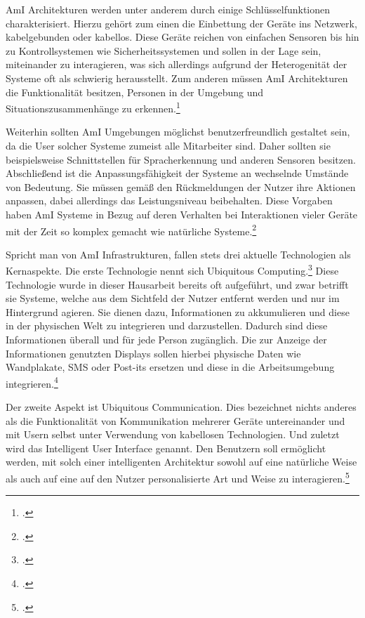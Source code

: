 AmI Architekturen werden unter anderem durch einige Schlüsselfunktionen charakterisiert. Hierzu gehört zum einen die Einbettung der Geräte ins Netzwerk, kabelgebunden oder kabellos. Diese Geräte reichen von einfachen Sensoren bis hin zu Kontrollsystemen wie Sicherheitssystemen und sollen in der Lage sein, miteinander zu interagieren, was sich allerdings aufgrund der Heterogenität der Systeme oft als schwierig herausstellt. Zum anderen müssen AmI Architekturen die Funktionalität besitzen, Personen in der Umgebung und Situationszusammenhänge zu erkennen.\footcite[Vgl.][Seite 585]{SpecialIssue}

Weiterhin sollten AmI Umgebungen möglichst benutzerfreundlich gestaltet sein, da die User solcher Systeme zumeist alle Mitarbeiter sind. Daher sollten sie beispielsweise Schnittstellen für Spracherkennung und anderen Sensoren besitzen. Abschließend ist die Anpassungsfähigkeit der Systeme an wechselnde Umstände von Bedeutung. Sie müssen gemäß den Rückmeldungen der Nutzer ihre Aktionen anpassen, dabei allerdings das Leistungsniveau beibehalten. Diese Vorgaben haben AmI Systeme in Bezug auf deren Verhalten bei Interaktionen vieler Geräte mit der Zeit so komplex gemacht wie natürliche Systeme.\footcite[Vgl.][Seite 586]{SpecialIssue}

Spricht man von AmI Infrastrukturen, fallen stets drei aktuelle Technologien als Kernaspekte. Die erste Technologie nennt sich Ubiquitous Computing.\footcite[Vgl.][Seite 1]{amiblabla} Diese Technologie wurde in dieser Hausarbeit bereits oft aufgeführt, und zwar betrifft sie Systeme, welche aus dem Sichtfeld der Nutzer entfernt werden und nur im Hintergrund agieren. Sie dienen dazu, Informationen zu akkumulieren und diese in der physischen Welt zu integrieren und darzustellen. Dadurch sind diese Informationen überall und für jede Person zugänglich. Die zur Anzeige der Informationen genutzten Displays sollen hierbei physische Daten wie Wandplakate, SMS oder Post-its ersetzen und diese in die Arbeitsumgebung integrieren.\footcite[Vgl.][Seite 71]{weiser}

Der zweite Aspekt ist Ubiquitous Communication. Dies bezeichnet nichts anderes als die Funktionalität von Kommunikation mehrerer Geräte untereinander und mit Usern selbst unter Verwendung von kabellosen Technologien. Und zuletzt wird das Intelligent User Interface genannt. Den Benutzern soll ermöglicht werden, mit solch einer intelligenten Architektur sowohl auf eine natürliche Weise als auch auf eine auf den Nutzer personalisierte Art und Weise zu interagieren.\footcite[Vgl.][Seite 1]{amiblabla}

